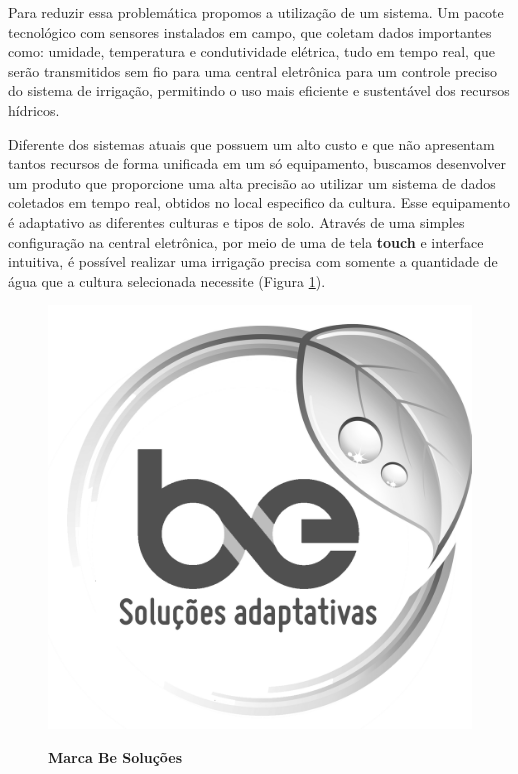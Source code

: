 Para reduzir essa problemática propomos a utilização de um sistema. Um pacote tecnológico com sensores instalados em campo, que coletam dados importantes como: umidade, temperatura e condutividade elétrica, tudo em tempo real, que serão transmitidos sem fio para uma central eletrônica para um controle preciso do sistema de irrigação, permitindo o uso mais eficiente e sustentável dos recursos hídricos.

Diferente dos sistemas atuais que possuem um alto custo e que não apresentam tantos recursos de forma unificada em um só equipamento, buscamos desenvolver um produto que proporcione uma alta precisão ao utilizar um sistema de dados coletados em tempo real, obtidos no local especifico da cultura. Esse equipamento é adaptativo as diferentes culturas e tipos de solo. Através de uma simples configuração na central eletrônica, por meio de uma de tela \textbf{touch} e interface intuitiva, é possível realizar uma irrigação precisa com somente a quantidade de água que a cultura selecionada necessite (Figura \ref{figura_20}).

\begin{figure}[!htb]
\centering
\caption{\textbf{Marca Be Soluções}}
\includegraphics[scale=0.4]{Imagens/besolucoes.png}
\label{figura_20}
\end{figure}




